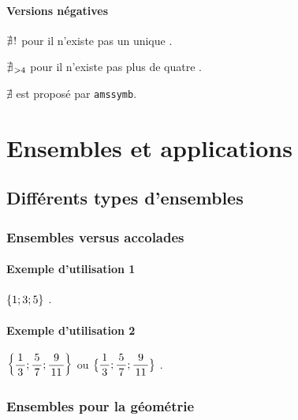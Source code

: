 \documentclass[12pt,a4paper]{article}
\theoremstyle{definition}
\begin{document}


\paragraph{Versions négatives}

\begin{latexex}
$\nexists\kern0.1em !$
pour \og il n'existe pas un unique \fg.

$\nexists_{\kern0.1em >4}$
pour \og il n'existe pas plus de
quatre \fg.

$\nexists$
est proposé par \verb+amssymb+.
\end{latexex}


\section{Ensembles et applications}

\subsection{Différents types d'ensembles}

\subsubsection{Ensembles versus accolades}

\paragraph{Exemple d'utilisation 1}

\begin{latexex}
$\setgene{1 ; 3 ; 5}$ .
\end{latexex}




\paragraph{Exemple d'utilisation 2}

\begin{latexex}
$\displaystyle
 \setgene{\frac{1}{3} ; \frac{5}{7} ; 
          \frac{9}{11}}$
ou
$\displaystyle
 \setgene*{\frac{1}{3} ; \frac{5}{7} ;
           \frac{9}{11}}$ .
\end{latexex}




\subsubsection{Ensembles pour la géométrie} \label{set-geo}
\end{document}
